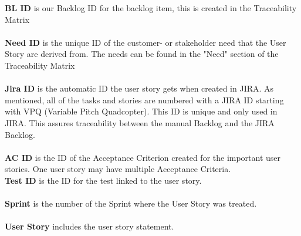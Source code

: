 \textbf{BL ID} is our Backlog ID for the backlog item, this is created in the Traceability Matrix \\ \\
\textbf{Need ID} is the unique ID of the customer- or stakeholder need that the User Story are derived from. The needs can be found in the "Need" section of the Traceability Matrix \\ \\
\textbf{Jira ID} is the automatic ID the user story gets when created in JIRA. As mentioned, all of the tasks and stories are numbered with a JIRA ID starting with VPQ (Variable Pitch Quadcopter). This ID is unique and only used in JIRA. This assures traceability between the manual Backlog and the JIRA Backlog. \\ \\
\textbf{AC ID} is the ID of the Acceptance Criterion created for the important user stories. One user story may have multiple Acceptance Criteria.  \\
\textbf{Test ID} is the ID for the test linked to the user story. \\ \\
\textbf{Sprint} is the number of the Sprint where the User Story was treated. \\ \\
\textbf{User Story} includes the user story statement. \\
\\
